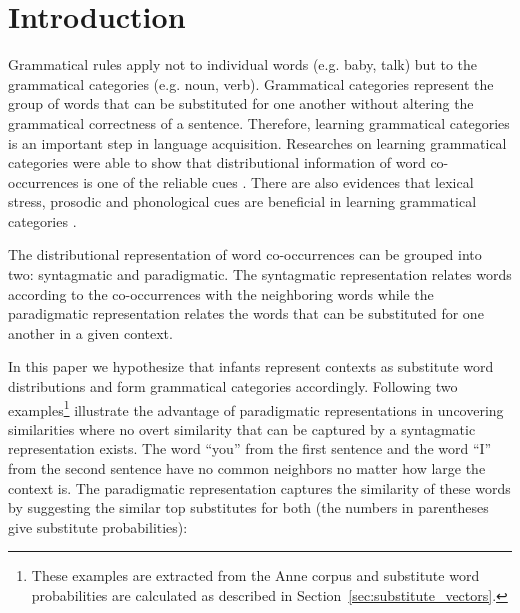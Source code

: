 \section{Introduction}
\label{sec:introduction}
Grammatical rules apply not to individual words (e.g. baby, talk) but to the
grammatical categories (e.g. noun, verb).  Grammatical categories represent the
group of words that can be substituted for one another without altering the
grammatical correctness of a sentence.  Therefore, learning grammatical
categories is an important step in language acquisition.  Researches on
learning grammatical categories were able to show that distributional
information of word co-occurrences is one of the reliable cues
\citep*{Mintz200391,clair2010,Redington98distributionalinformation}.  There are also evidences that
lexical stress, prosodic and phonological cues are beneficial in learning
grammatical categories \citep*{monaghan2012integrating,saffran1996word,saffran1996word}. 

The distributional representation of word co-occurrences can be grouped into
two: syntagmatic and paradigmatic.  The syntagmatic representation relates
words according to the co-occurrences with the neighboring words while the
paradigmatic representation relates the words that can be substituted for one
another in a given context.

In this paper we hypothesize that infants represent contexts as substitute word
distributions and form grammatical categories accordingly.
Following two examples\footnote{These examples are extracted from the Anne
corpus and substitute word probabilities are calculated as described in
Section~\ref{sec:substitute_vectors}.} illustrate the advantage of paradigmatic
representations in uncovering similarities where no overt similarity that can
be captured by a syntagmatic representation exists. The word ``you'' from the
first sentence and the word ``I'' from the second sentence have no common
neighbors no matter how large the context is.  The paradigmatic representation
captures the similarity of these words by suggesting the similar top
substitutes for both (the numbers in parentheses give substitute
probabilities): 


